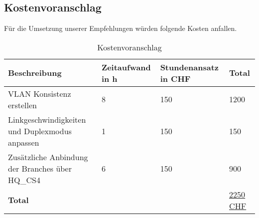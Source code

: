 \subsection{Kostenvoranschlag}
Für die Umsetzung unserer Empfehlungen würden folgende Kosten anfallen.
\begin{table}[h]
	\centering
	\begin{tabu} to \linewidth {X[3] X X X}
		\toprule 
		Beschreibung & Zeitaufwand in h  & Stundenansatz in CHF & Total \\
		\midrule
		VLAN Konsistenz erstellen & 8 & 150 & 1200 \\
		Linkgeschwindigkeiten und Duplexmodus anpassen & 1 & 150 & 150 \\
		Zusätzliche Anbindung der Branches über HQ\_CS4 & 6 & 150 & 900 \\
		
		\textbf{Total} & & & \underline{\underline{2250 CHF}} \\
		\bottomrule 
	\end{tabu} 
	\caption{Kostenvoranschlag}
\end{table}


